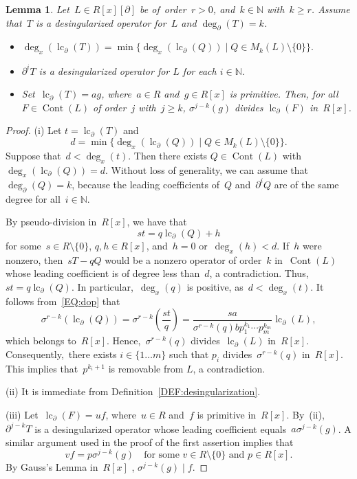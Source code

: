\documentclass{sig-alternate}
\newcommand{\bN} { {\mathbb{N}}}
\newcommand{\cont}{\operatorname{Cont}}
\newcommand{\lc}{\operatorname{lc}}
\newcommand{\si} { {\sigma}}
\newcommand{\pa}{\partial}
\newtheorem{lemma}[theorem]{Lemma}
\begin{document}
\begin{lemma}\label{LM:key}
Let~$L \in R[x][\pa]$ be of~order~$r > 0$, and~$k \in \bN$ with~$k \geq r$.
Assume that~$T$ is a desingularized operator for~$L$ and $\deg_{\pa}(T) = k$.
\begin{itemize}
\item[(i)] $\deg_{x}(\lc_{\pa}(T)) = \min \{  \deg_{x}(\lc_{\pa}(Q)) \mid Q \in M_k(L) \setminus \{0\}\}.$
\item[(ii)] $\pa^i T$ is a desingularized operator for $L$
for each $i \in \bN$.
\item[(iii)] Set~$\lc_{\pa}(T) = a g$, where~$a \in R$ and~$g \in R[x]$ is primitive.
Then, for all~$F \in \cont(L)$ of order~$j$ with~$j \ge k$, $\si^{j - k}(g)$ divides $\lc_{\pa}(F)$ in~$R[x]$.
\end{itemize}
\end{lemma}
\begin{proof}
(i) Let $ t = \lc_{\pa}(T)$ and
$$d = \min \{\! \deg_{x}(\lc_{\pa}(Q))\! \mid Q \in M_k(L) \setminus \{0\} \}.$$
Suppose that~$d < \deg_{x}(t)$.
Then there exists $Q \in \cont(L)$ with~$\deg_{x}(\lc_{\pa}(Q)) = d$. Without loss of
generality, we can assume that~$\deg_{\pa}(Q) = k$, because the leading coefficients of~$Q$ and~$\pa^i Q$
are of the same degree for all~$i \in \bN$.

By pseudo-division in~$R[x]$, we have that
$$s t = q \lc_\pa(Q) + h$$
for some~$s {\in} R {\setminus} \{0\}$, $q, h {\in} R[x]$,
and~$h=0$ or~$\deg_x(h) < d$. If~$h$ were nonzero, then~$s T - q Q$ would be a nonzero operator of order~$k$ in~$\cont(L)$
whose leading coefficient is of degree less than~$d$, a contradiction. Thus,~$s t = q \lc_{\pa}(Q)$.
In particular,~$\deg_x(q)$ is positive, as~$d < \deg_{x}(t)$.
It follows from~\eqref{EQ:dop} that
$$\si^{r -k}(\lc_{\pa}(Q)) = \si^{r-k} \left( \frac{s t}{q}\right) = \frac{s a}{\sigma^{r-k}(q) b p_1^{k_1} \cdots p_m^{k_m}} \lc_{\pa}(L),$$
which belongs to~$R[x]$.  Hence,~$\si^{r-k}(q)$ divides~$\lc_{\pa}(L)$ in~$R[x]$. Consequently,~there exists $i \in \{1 \ldots m \}$ such that $p_i$ divides~$\si^{r-k}(q)$ in~$R[x]$. This implies that~$p^{k_i+1}$ is removable from $L$, a contradiction.

(ii) It is immediate from Definition~\ref{DEF:desingularization}.

(iii) Let~$\lc_{\pa}(F) = u f$, where~$u \in R$ and~$f$ is primitive in~$R[x]$.
By~(ii), $\pa^{j - k} T$ is a desingularized operator whose leading coefficient
equals~$a \si^{j - k}(g)$.
A similar argument used in the proof of the first assertion implies that
$$ v f =  p \si^{j - k}(g) \quad
\text{for some~$v \in R \setminus \{0\}$ and~$p \in R[x]$.}$$
By Gauss's Lemma in~$R[x]$ , $\si^{j - k}(g) \mid f$.
\end{proof}
\end{document}
